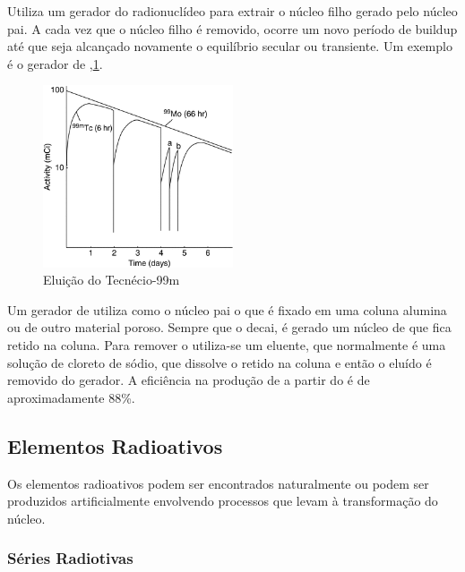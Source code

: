 \documentclass[11pt,a4paper]{article}
\newcounter{exemplo}
\begin{document}
                Utiliza um gerador do radionuclídeo para extrair o núcleo filho gerado pelo núcleo pai. A cada vez que o núcleo filho é removido, ocorre um novo período de buildup até que seja alcançado novamente o equilíbrio secular ou transiente. Um exemplo é o gerador de ,\ref{fig:graficoEluicaoTecnecio}.


                    \begin{figure}[h]
                        \centering
                        \includegraphics[width=0.5\textwidth]{Imagens/graficoEluicaoTecnecio.jpg}
                        \caption{Eluição do Tecnécio-99m}
                        \label{fig:graficoEluicaoTecnecio}
                    \end{figure}

                Um gerador de  utiliza como o núcleo pai o  que é fixado em uma coluna alumina ou de outro material poroso. Sempre que o  decai, é gerado um núcleo de  que fica retido na coluna. Para remover o  utiliza-se um eluente, que normalmente é uma solução de cloreto de sódio, que dissolve o  retido na coluna e então o  eluído é removido do gerador. A eficiência na produção de  a partir do  é de aproximadamente 88\%.
             
        \subsection{Elementos Radioativos}
            
            Os elementos radioativos podem ser encontrados naturalmente ou podem ser produzidos artificialmente envolvendo processos que levam à transformação do núcleo.

            \subsubsection{Séries Radiotivas}
            
\end{document}
